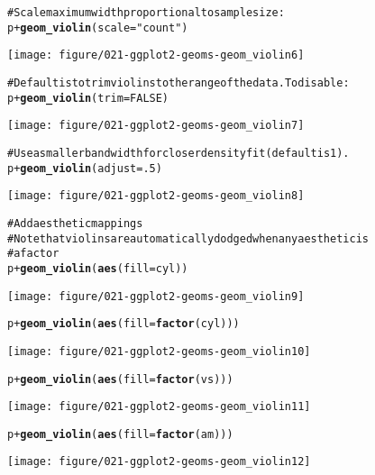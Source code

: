 \documentclass[a4paper,titlepage]{tufte-handout}\usepackage{graphicx, color}
\makeatletter
\def\maxwidth{ %
  \ifdim\Gin@nat@width>\linewidth
    \linewidth
  \else
    \Gin@nat@width
  \fi
}
\newcommand{\hlfunctioncall}[1]{\textcolor[rgb]{0.501960784313725,0,0.329411764705882}{\textbf{#1}}}%
\newcommand{\hlstring}[1]{\textcolor[rgb]{0.6,0.6,1}{#1}}%
\newcommand{\hlcomment}[1]{\textcolor[rgb]{0.180392156862745,0.6,0.341176470588235}{#1}}%
\newenvironment{kframe}{%
 \def\at@end@of@kframe{}%
 \ifinner\ifhmode%
  \def\at@end@of@kframe{\end{minipage}}%
  \begin{minipage}{\columnwidth}%
 \fi\fi%
 \def\FrameCommand##1{\hskip\@totalleftmargin \hskip-\fboxsep
 \colorbox{shadecolor}{##1}\hskip-\fboxsep
     \hskip-\linewidth \hskip-\@totalleftmargin \hskip\columnwidth}%
 \MakeFramed {\advance\hsize-\width
   \@totalleftmargin\z@ \linewidth\hsize
   \@setminipage}}%
 {\par\unskip\endMakeFramed%
 \at@end@of@kframe}
\newenvironment{knitrout}{}{} %
\makeatother
\begin{document}
\begin{knitrout}
\begin{kframe}
\begin{alltt}
\hlcomment{# Scale maximum width proportional to sample size:}
p + \hlfunctioncall{geom_violin}(scale = \hlstring{"count"})
\end{alltt}
\end{kframe}
\texttt{[image: figure/021-ggplot2-geoms-geom\_violin6]} 
\begin{kframe}\begin{alltt}

\hlcomment{# Default is to trim violins to the range of the data. To disable:}
p + \hlfunctioncall{geom_violin}(trim = FALSE)
\end{alltt}
\end{kframe}
\texttt{[image: figure/021-ggplot2-geoms-geom\_violin7]} 
\begin{kframe}\begin{alltt}

\hlcomment{# Use a smaller bandwidth for closer density fit (default is 1).}
p + \hlfunctioncall{geom_violin}(adjust = .5)
\end{alltt}
\end{kframe}
\texttt{[image: figure/021-ggplot2-geoms-geom\_violin8]} 
\begin{kframe}\begin{alltt}

\hlcomment{# Add aesthetic mappings}
\hlcomment{# Note that violins are automatically dodged when any aesthetic is}
\hlcomment{# a factor}
p + \hlfunctioncall{geom_violin}(\hlfunctioncall{aes}(fill = cyl))
\end{alltt}
\end{kframe}
\texttt{[image: figure/021-ggplot2-geoms-geom\_violin9]} 
\begin{kframe}\begin{alltt}
p + \hlfunctioncall{geom_violin}(\hlfunctioncall{aes}(fill = \hlfunctioncall{factor}(cyl)))
\end{alltt}
\end{kframe}
\texttt{[image: figure/021-ggplot2-geoms-geom\_violin10]} 
\begin{kframe}\begin{alltt}
p + \hlfunctioncall{geom_violin}(\hlfunctioncall{aes}(fill = \hlfunctioncall{factor}(vs)))
\end{alltt}
\end{kframe}
\texttt{[image: figure/021-ggplot2-geoms-geom\_violin11]} 
\begin{kframe}\begin{alltt}
p + \hlfunctioncall{geom_violin}(\hlfunctioncall{aes}(fill = \hlfunctioncall{factor}(am)))
\end{alltt}
\end{kframe}
\texttt{[image: figure/021-ggplot2-geoms-geom\_violin12]} 
\begin{kframe}\begin{alltt}


\end{alltt}
\end{kframe}
\end{knitrout}
\end{document}
